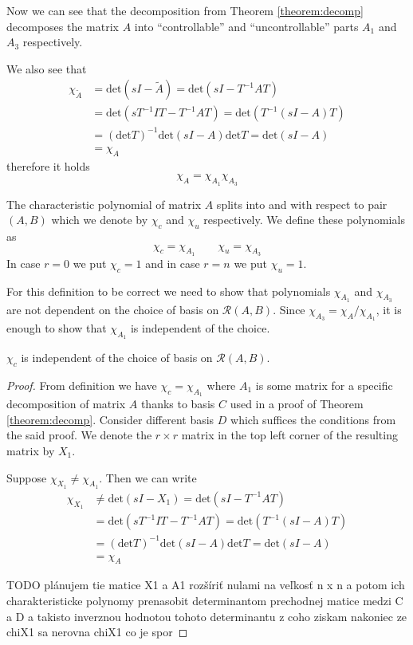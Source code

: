 Now we can see that the decomposition from Theorem \ref{theorem:decomp} decomposes the matrix $A$ into ``controllable'' and ``uncontrollable'' parts $A_1$ and $A_3$ respectively.

We also see that 
\begin{align*}
	\chi_{\widetilde{A}}&=\text{det}(sI-\widetilde{A})=\text{det}(sI-T^{-1}AT) \\
	&=\text{det}(sT^{-1}IT-T^{-1}AT)=\text{det}(T^{-1}(sI-A)T) \\
	&=(\text{det}T)^{-1}\text{det}(sI-A)\text{det}T=\text{det}(sI-A) \\
	&=\chi_A
\end{align*}
therefore it holds $$\chi_A=\chi_{A_1}\chi_{A_3}$$ 

\begin{definition}
	The characteristic polynomial of matrix $A$ splits into  and  with respect to pair $(A,B)$ which we denote by $\chi_c$ and $\chi_u$ respectively. We define these polynomials as $$\chi_c=\chi_{A_1} \qquad \chi_u=\chi_{A_3}$$ In case $r=0$ we put $\chi_c=1$ and in case $r=n$ we put $\chi_u=1$.
\end{definition}

For this definition to be correct we need to show that polynomials $\chi_{A_1}$ and $\chi_{A_3}$ are not dependent on the choice of basis on $\mathcal{R}(A,B)$. Since $\chi_{A_3}=\chi_A/\chi_{A_1}$, it is enough to show that $\chi_{A_1}$ is independent of the choice.

\begin{lemma}
	$\chi_c$ is independent of the choice of basis on $\mathcal{R}(A,B)$.
\end{lemma}

\begin{proof}
	From definition we have $\chi_c=\chi_{A_1}$ where $A_1$ is some matrix for a specific decomposition of matrix $A$ thanks to basis $C$ used in a proof of Theorem \ref{theorem:decomp}. Consider different basis $D$ which suffices the conditions from the said proof. We denote the $r \times r$ matrix in the top left corner of the resulting matrix by $X_1$. 

	Suppose $\chi_{X_1}\neq \chi_{A_1}$. Then we can write 
	\begin{align*}
		\chi_{X_1}&\neq\text{det}(sI-X_1)=\text{det}(sI-T^{-1}AT) \\
		&=\text{det}(sT^{-1}IT-T^{-1}AT)=\text{det}(T^{-1}(sI-A)T) \\
		&=(\text{det}T)^{-1}\text{det}(sI-A)\text{det}T=\text{det}(sI-A) \\
		&=\chi_A
	\end{align*}

	TODO plánujem tie matice X1 a A1 rozšíriť nulami na veľkosť n x n a potom ich charakteristicke polynomy prenasobit determinantom prechodnej matice medzi C a D a takisto inverznou hodnotou tohoto determinantu z coho ziskam nakoniec ze chiX1 sa nerovna chiX1 co je spor
\end{proof}